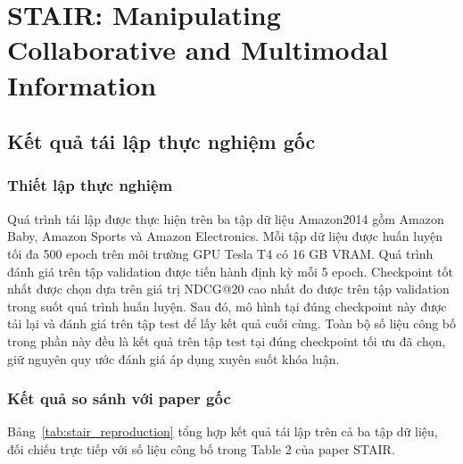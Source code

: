 \section{STAIR: Manipulating Collaborative and Multimodal Information}

\subsection{Kết quả tái lập thực nghiệm gốc}
\label{sec:stair_reproduction}

\subsubsection{Thiết lập thực nghiệm}

Quá trình tái lập được thực hiện trên ba tập dữ liệu Amazon2014 gồm Amazon Baby, Amazon Sports và Amazon Electronics. Mỗi tập dữ liệu được huấn luyện tối đa 500 epoch trên môi trường GPU Tesla T4 có 16 GB VRAM. Quá trình đánh giá trên tập validation được tiến hành định kỳ mỗi 5 epoch. Checkpoint tốt nhất được chọn dựa trên giá trị NDCG@20 cao nhất đo được trên tập validation trong suốt quá trình huấn luyện. Sau đó, mô hình tại đúng checkpoint này được tải lại và đánh giá trên tập test để lấy kết quả cuối cùng. Toàn bộ số liệu công bố trong phần này đều là kết quả trên tập test tại đúng checkpoint tối ưu đã chọn, giữ nguyên quy ước đánh giá áp dụng xuyên suốt khóa luận.

\subsubsection{Kết quả so sánh với paper gốc}

Bảng~\ref{tab:stair_reproduction} tổng hợp kết quả tái lập trên cả ba tập dữ liệu, đối chiếu trực tiếp với số liệu công bố trong Table 2 của paper STAIR.

